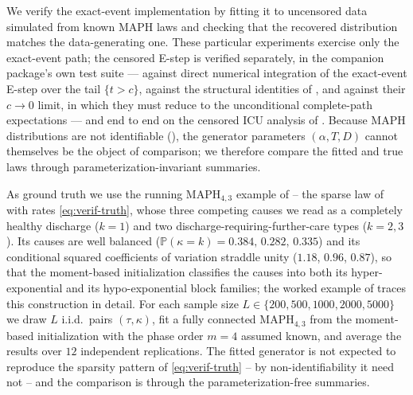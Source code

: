 \documentclass{article}
\newcommand{\Prob}{\mathbb{P}}
\newenvironment{rcrevision}{}{}
\newcommand{\aachg}[1]{#1}
\begin{document}
\begin{rcrevision}
We verify the exact-event implementation by fitting it to uncensored data simulated from known MAPH laws and checking that the recovered distribution matches the data-generating one. These particular experiments exercise only the exact-event path; the censored E-step is verified separately, \aachg{in the companion package's own test suite --- against direct numerical integration of the exact-event E-step over the tail $\{t>c\}$, against the structural identities of \Cref{prop:e-step-censored}, and against their $c\to0$ limit, in which they must reduce to the unconditional complete-path expectations --- and} end to end on the censored ICU analysis of . Because MAPH distributions are not identifiable (), the generator parameters $(\alpha,T,D)$ cannot themselves be the object of comparison; we therefore compare the fitted and true laws through parameterization-invariant summaries.
\end{rcrevision}

As ground truth we use the running $\text{MAPH}_{4,3}$ example of  -- the sparse law of  with rates \eqref{eq:verif-truth}, whose three competing causes we read as a completely healthy discharge ($k=1$) and two discharge-requiring-further-care types ($k=2,3$). Its causes are well balanced ($\Prob(\kappa=k)=0.384,\,0.282,\,0.335$) and its conditional squared coefficients of variation straddle unity ($1.18$, $0.96$, $0.87$), so that the moment-based initialization classifies the causes into both its hyper-exponential and its hypo-exponential block families; the worked example of  traces this construction in detail. For each sample size $L\in\{200,500,1000,2000,5000\}$ we draw $L$ i.i.d.\ pairs $(\tau,\kappa)$, fit a fully connected $\text{MAPH}_{4,3}$ from the moment-based initialization with the phase order $m=4$ assumed known, and average the results over $12$ independent replications. The fitted generator is not expected to reproduce the sparsity pattern of \eqref{eq:verif-truth} -- by non-identifiability it need not -- and the comparison is through the parameterization-free summaries.
\end{document}
